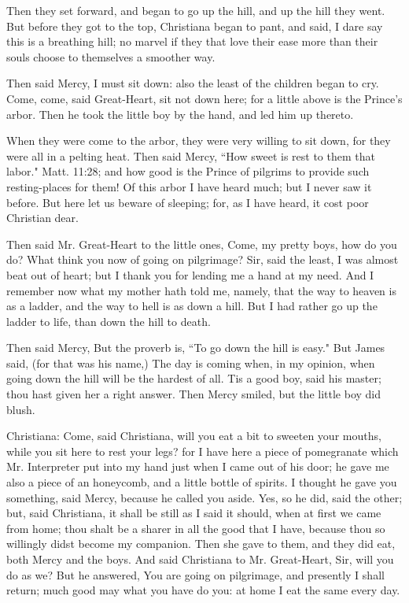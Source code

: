 Then they set forward, and began to go up the hill, and up the hill they went. But before they got to the top, Christiana began to pant, and said, I dare say this is a breathing hill; no marvel if they that love their ease more than their souls choose to themselves a smoother way.

Then said Mercy, I must sit down: also the least of the children began to cry. Come, come, said Great-Heart, sit not down here; for a little above is the Prince's arbor. Then he took the little boy by the hand, and led him up thereto.

When they were come to the arbor, they were very willing to sit down, for they were all in a pelting heat. Then said Mercy, ``How sweet is rest to them that labor." Matt. 11:28; and how good is the Prince of pilgrims to provide such resting-places for them! Of this arbor I have heard much; but I never saw it before. But here let us beware of sleeping; for, as I have heard, it cost poor Christian dear.

Then said Mr. Great-Heart to the little ones, Come, my pretty boys, how do you do? What think you now of going on pilgrimage? Sir, said the least, I was almost beat out of heart; but I thank you for lending me a hand at my need. And I remember now what my mother hath told me, namely, that the way to heaven is as a ladder, and the way to hell is as down a hill. But I had rather go up the ladder to life, than down the hill to death.

Then said Mercy, But the proverb is, ``To go down the hill is easy." But James said, (for that was his name,) The day is coming when, in my opinion, when going down the hill will be the hardest of all. Tis a good boy, said his master; thou hast given her a right answer. Then Mercy smiled, but the little boy did blush.

Christiana: Come, said Christiana, will you eat a bit to sweeten your mouths, while you sit here to rest your legs? for I have here a piece of pomegranate which Mr. Interpreter put into my hand just when I came out of his door; he gave me also a piece of an honeycomb, and a little bottle of spirits. I thought he gave you something, said Mercy, because he called you aside. Yes, so he did, said the other; but, said Christiana, it shall be still as I said it should, when at first we came from home; thou shalt be a sharer in all the good that I have, because thou so willingly didst become my companion. Then she gave to them, and they did eat, both Mercy and the boys. And said Christiana to Mr. Great-Heart, Sir, will you do as we? But he answered, You are going on pilgrimage, and presently I shall return; much good may what you have do you: at home I eat the same every day. 
